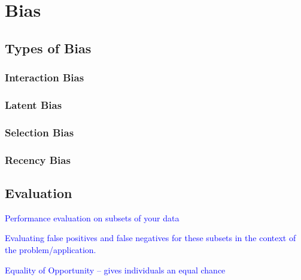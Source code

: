 \section{Bias}

\subsection{Types of Bias}

\subsubsection{Interaction Bias}

\subsubsection{Latent Bias}

\subsubsection{Selection Bias}

\subsubsection{Recency Bias}

\subsection{Evaluation}

\textcolor{blue}{Performance evaluation on subsets of your data}

\textcolor{blue}{Evaluating false positives and false negatives for these subsets in the context of the problem/application.}

\textcolor{blue}{Equality of Opportunity -- gives individuals an equal chance}
